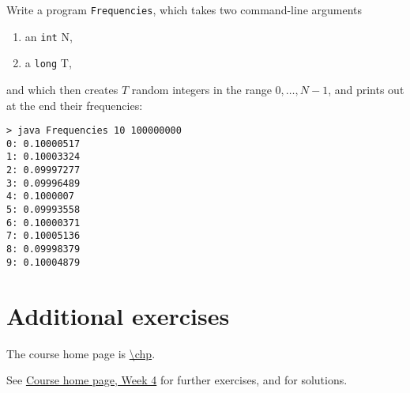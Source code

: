 \documentclass[11pt]{article}
\begin{document}
Write a program \texttt{Frequencies}, which takes two command-line arguments
\begin{enumerate}
\item an \texttt{int} N,
\item a \texttt{long} T,
\end{enumerate}
and which then creates $T$ random integers in the range $0, \dots, N-1$, and prints out at the end their frequencies:
\begin{verbatim}
> java Frequencies 10 100000000
0: 0.10000517
1: 0.10003324
2: 0.09997277
3: 0.09996489
4: 0.1000007
5: 0.09993558
6: 0.10000371
7: 0.10005136
8: 0.09998379
9: 0.10004879
\end{verbatim}



\section{Additional exercises}
\label{sec:addex}

The course home page is \url{\chp}.

See \href{\chp#ExercisesWeek04}{Course home page, Week 4} for further exercises, and for solutions.
\end{document}
